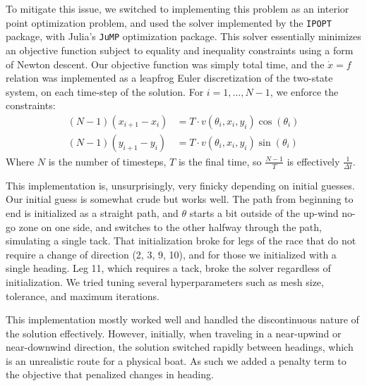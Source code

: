 \documentclass[11pt]{amsart}
\begin{document}
\par To mitigate this issue, we switched to implementing this problem as an interior point optimization problem, and used the solver implemented by the \texttt{IPOPT} package, with Julia's \texttt{JuMP} optimization package. This solver essentially minimizes an objective function subject to equality and inequality constraints using a form of Newton descent. Our objective function was simply total time, and the $\dot{x} = f$ relation was implemented as a leapfrog Euler discretization of the two-state system, on each time-step of the solution. For $i = 1, \ldots, N-1$, we enforce the constraints:
\begin{align*}
(N-1)(x_{i+1} - x_i) &= T \cdot v(\theta_i, x_i, y_i) \cos(\theta_i) \\
(N-1)(y_{i+1} - y_i) &= T \cdot v(\theta_i, x_i, y_i) \sin(\theta_i)
\end{align*}
Where $N$ is the number of timesteps, $T$ is the final time, so $\frac{N-1}{T}$ is effectively $\frac{1}{\Delta t}$.

\par This implementation is, unsurprisingly, very finicky depending on initial guesses. Our initial guess is somewhat crude but works well. The path from beginning to end is initialized as a straight path, and $\theta$ starts a bit outside of the up-wind no-go zone on one side, and switches to the other halfway through the path, simulating a single tack. That initialization broke for legs of the race that do not require a change of direction (2, 3, 9, 10), and for those we initialized with a single heading. Leg 11, which requires a tack, broke the solver regardless of initialization. We tried tuning several hyperparameters such as mesh size, tolerance, and maximum iterations.

\par This implementation mostly worked well and handled the discontinuous nature of the solution effectively. However, initially, when traveling in a near-upwind or near-downwind direction, the solution switched rapidly between headings, which is an unrealistic route for a physical boat. As such we added a penalty term to the objective that penalized changes in heading. 

\end{document}

